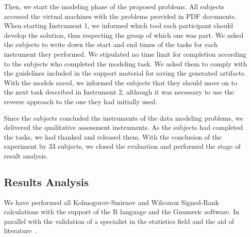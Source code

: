 Then, we start the modeling phase of the proposed problems.
All subjects accessed the virtual machines with the problems provided in PDF documents.
When starting Instrument 1, we informed which tool each participant should develop the solution, thus respecting the group of which one was part.
We asked the subjects to write down the start and end times of the tasks for each instrument they performed.
We stipulated no time limit for completion according to the subjects who completed the modeling task. 
We asked them to comply with the guidelines included in the support material for saving the generated artifacts.
With the models saved, we informed the subjects that they should move on to the next task described in Instrument 2, although it was necessary to use the reverse approach to the one they had initially used.

Since the subjects concluded the instruments of the data modeling problems, we delivered the qualitative assessment instruments.
As the subjects had completed the tasks, we had thanked and released them.
With the conclusion of the experiment by 33 subjects, we closed the evaluation and performed the stage of result analysis.

\subsection{Results Analysis}
\label{ssec_experiments:preliminary_resultAnalysis}

We have performed all Kolmogorov-Smirnov and Wilcoxon Signed-Rank calculations with the support of the R language and the Gnumeric software. In parallel with the validation of a specialist in the statistics field and the aid of literature~\cite{Triola:2018}.

